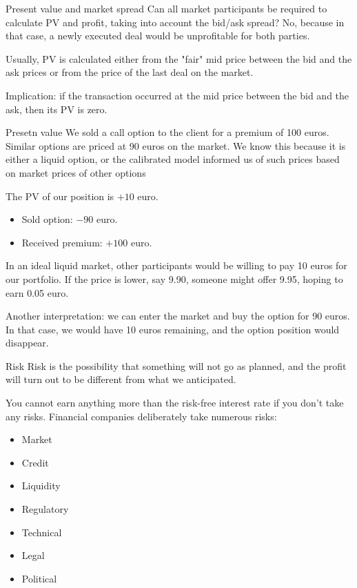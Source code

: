 \documentclass{beamer}
\begin{document}
\begin{frame}{Present value and market spread}
\justify
Can all market participants be required to calculate PV and profit, taking into account the bid/ask spread? No, because in that case, a newly executed deal would be unprofitable for both parties.

\justify
Usually, PV is calculated either from the "fair" mid price between the bid and the ask prices or from the price of the last deal on the market.

\justify
Implication: if the transaction occurred at the mid price between the bid and the ask, then its PV is zero.
\end{frame}



\begin{frame}{Presetn value}
\justify
We sold a call option to the client for a premium of 100 euros. Similar options are priced at 90 euros on the market. We know this because it is either a liquid option, or the calibrated model informed us of such prices based on market prices of other options

\justify
The PV of our position is $+10$ euro.
\begin{itemize}
\item Sold option: $-90$ euro.
\item Received premium: $+100$ euro.
\end{itemize}

\justify
In an ideal liquid market, other participants would be willing to pay 10 euros for our portfolio. If the price is lower, say 9.90, someone might offer 9.95, hoping to earn 0.05 euro.

\justify
Another interpretation: we can enter the market and buy the option for 90 euros. In that case, we would have 10 euros remaining, and the option position would disappear.
\end{frame}



\begin{frame}{Risk}
\justify
\alert{Risk} is the possibility that something will not go as planned, and the profit will turn out to be different from what we anticipated.

\justify
You cannot earn anything more than the risk-free interest rate if you don't take any risks. Financial companies deliberately take numerous risks:

\begin{itemize}
\item Market
\item Credit
\item Liquidity
\item Regulatory
\item Technical
\item Legal
\item Political
\end{itemize}
\end{frame}
\end{document}
